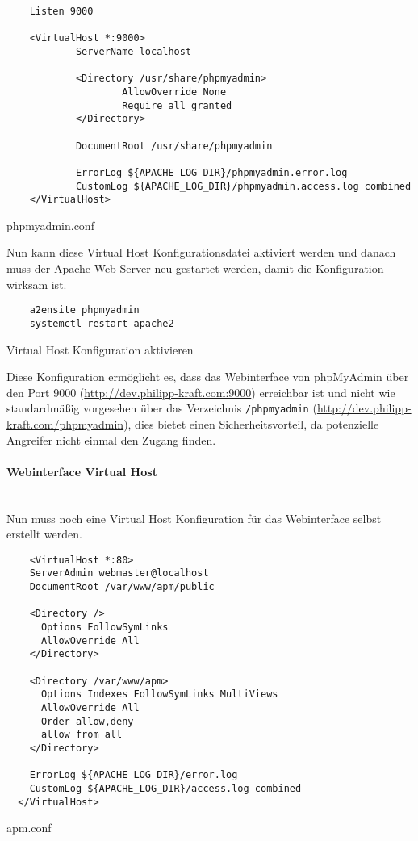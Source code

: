 \begin{listing}[H]
  \begin{verbatim}
    Listen 9000

    <VirtualHost *:9000>
            ServerName localhost
    
            <Directory /usr/share/phpmyadmin>
                    AllowOverride None
                    Require all granted
            </Directory>
    
            DocumentRoot /usr/share/phpmyadmin
    
            ErrorLog ${APACHE_LOG_DIR}/phpmyadmin.error.log
            CustomLog ${APACHE_LOG_DIR}/phpmyadmin.access.log combined
    </VirtualHost>
  \end{verbatim}
  \caption{phpmyadmin.conf}
\end{listing}

Nun kann diese Virtual Host Konfigurationsdatei aktiviert werden und danach
muss der Apache Web Server neu gestartet werden, damit die Konfiguration wirksam
ist.

\begin{listing}[H]
  \begin{verbatim}
    a2ensite phpmyadmin
    systemctl restart apache2
  \end{verbatim}
  \caption{Virtual Host Konfiguration aktivieren}
\end{listing}

Diese Konfiguration ermöglicht es, dass das Webinterface von phpMyAdmin über den
Port 9000 (\url{http://dev.philipp-kraft.com:9000}) erreichbar ist und nicht wie
standardmäßig vorgesehen über das Verzeichnis \verb|/phpmyadmin|
(\url{http://dev.philipp-kraft.com/phpmyadmin}), dies bietet einen
Sicherheitsvorteil, da potenzielle Angreifer nicht einmal den Zugang finden.

\paragraph{Webinterface Virtual Host}\mbox{}\\

Nun muss noch eine Virtual Host Konfiguration für das Webinterface selbst
erstellt werden.

\begin{listing}[H]
  \begin{verbatim}
    <VirtualHost *:80>
    ServerAdmin webmaster@localhost
    DocumentRoot /var/www/apm/public
          
    <Directory />
      Options FollowSymLinks
      AllowOverride All
    </Directory>
  
    <Directory /var/www/apm>
      Options Indexes FollowSymLinks MultiViews
      AllowOverride All
      Order allow,deny
      allow from all
    </Directory>
  
    ErrorLog ${APACHE_LOG_DIR}/error.log
    CustomLog ${APACHE_LOG_DIR}/access.log combined
  </VirtualHost>
  \end{verbatim}
  \caption{apm.conf}
\end{listing}

